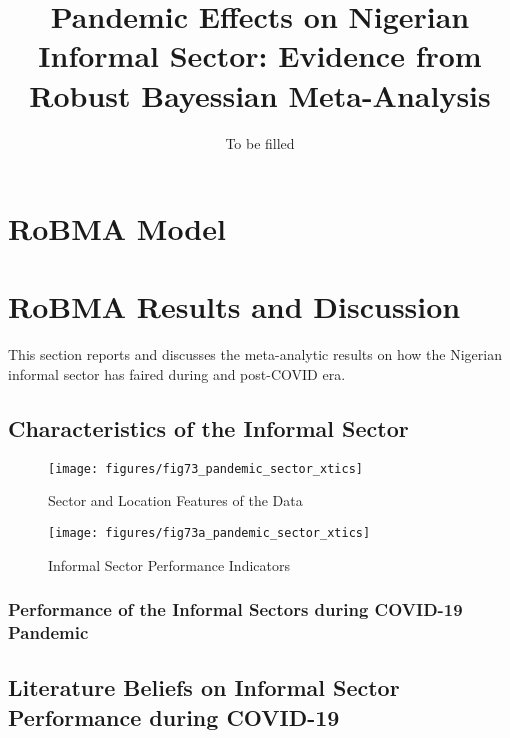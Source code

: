 \documentclass[12pt, article]{article}
\title{Pandemic Effects on Nigerian Informal Sector: Evidence from Robust Bayessian Meta-Analysis}
\author{To be filled}
\begin{document}
    \maketitle
    \newpage
    \tableofcontents


    \abstract
    \newpage


    \section{RoBMA Model}


    \section{RoBMA Results and Discussion}\label{sec4:robma-results-and-discussion}
    This section reports and discusses the meta-analytic results on how the Nigerian informal sector has faired during and post-COVID era.

    \subsection{Characteristics of the Informal Sector}\label{subsec4.1:characteristics-of-the-informal-sector}
    \begin{figure}[H]
        \centering
        \texttt{[image: figures/fig73\_pandemic\_sector\_xtics]}
        \caption{Sector and Location Features of the Data}
        \label{fig2:pandemic-sector-xtics}
    \end{figure}

    \begin{figure}[H]
        \centering
        \texttt{[image: figures/fig73a\_pandemic\_sector\_xtics]}
        \caption{Informal Sector Performance Indicators}
        \label{fig3:pandemic-sector-xtics}
    \end{figure}

    \subsubsection{Performance of the Informal Sectors during COVID-19 Pandemic}\label{subsubsec4.2.1:performance-of-the-informal-sectors-during-covid-19-pandemic}

    \subsection{Literature Beliefs on Informal Sector Performance during COVID-19}\label{subsec4.3:literature-beliefs-on-informal-sector-performance-during-covid-19}
\end{document}
